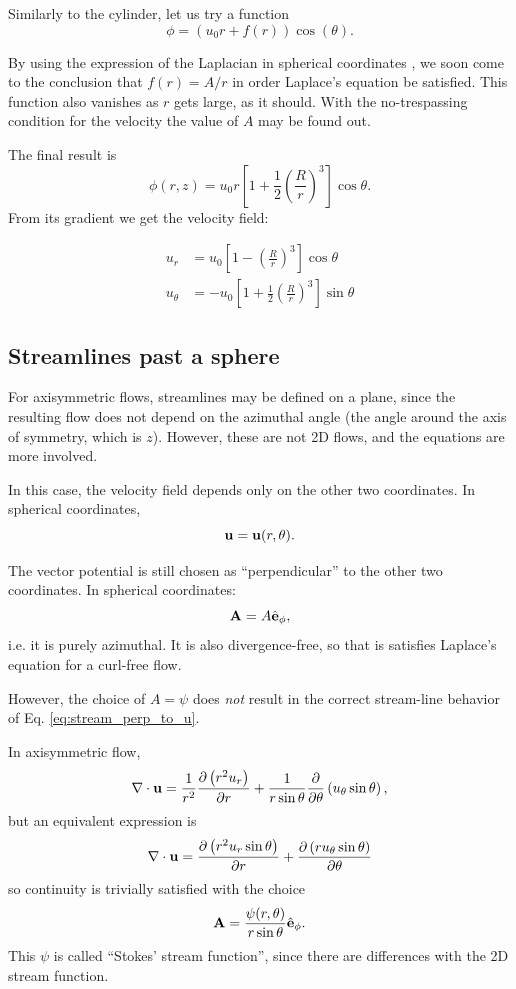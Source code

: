Similarly to the cylinder, let us try a function
\[
\phi =  \left( u_0 r  + f(r) \right) \cos(\theta)  .
\]

By using the expression of the Laplacian in spherical coordinates
\cite{wiki:del}, we soon come to the conclusion that $f(r)= A/r $ in
order Laplace's equation be satisfied. This function also vanishes as
$r$ gets large, as it should. With the no-trespassing condition for the
velocity the value of $A$ may be found out.

The final result is
\[
  \phi(r,z) = u_0 r
  \left[
    1 +
    \frac12 \left( \frac{R}{r}\right)^3
  \right] \cos\theta .
\]
From its gradient we get the velocity field:

\begin{align*}
u_r &=  u_0
  \left[
    1 -
      \left(\frac{R}{r}\right)^3
  \right] \cos\theta \\
u_\theta &=  -u_0
  \left[
    1 + \frac12
      \left(\frac{R}{r}\right)^3
  \right] \sin\theta
\end{align*}


\subsection{Streamlines past a sphere}

For axisymmetric flows, streamlines may be defined on a plane, since
the resulting flow does not depend on the azimuthal angle (the angle
around the axis of symmetry, which is $z$). However, these are not 2D
flows, and the equations are more involved.

In this case, the velocity field depends only on the other two
coordinates. In spherical coordinates,
\[
  \mathbf{u} = \mathbf{u}(r,\theta) .
\]

The vector potential is still chosen as ``perpendicular'' to the other
two coordinates. In spherical coordinates:
\[
  \mathbf{A} = A \hat{\mathbf{e}}_\phi ,
\]
i.e. it is purely azimuthal. It is also divergence-free, so that is
satisfies Laplace's equation for a curl-free flow.

However, the choice of $A=\psi$ does \emph{not} result in the correct
stream-line behavior of Eq.  \ref{eq:stream_perp_to_u}.



In axisymmetric flow,
\[
  \nabla\cdot\mathbf{u} =
  {1 \over r^2}{\partial \left( r^2 u_r \right) \over  \partial r} +
  {1 \over r\sin\theta}{\partial \over \partial  \theta} \left( u_\theta\sin\theta \right) ,
\]
but an equivalent expression is
\[
  \nabla\cdot\mathbf{u} =
  {\partial \left( r^2 u_r \sin\theta \right) \over  \partial r} +
  {\partial \left( r u_\theta\sin\theta \right)  \over \partial  \theta}
\]
so continuity is trivially satisfied with the choice
\begin{equation}
  \label{eq:Stokes_stream_spherical}
  \mathbf{A} = \frac{\psi(r,\theta)}{r \sin\theta } \hat{\mathbf{e}}_\phi .    
\end{equation}
%
This $\psi$ is called ``Stokes' stream function'', since there are differences with the 2D stream function.

